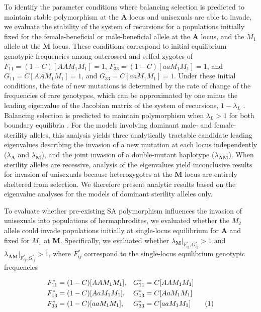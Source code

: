 \documentclass[9pt,twocolumn,twoside,lineno]{gsajnl}
\newcommand\numberthis{\addtocounter{equation}{1}\tag{\theequation}}
\begin{document}
To identify the parameter conditions where balancing selection is predicted to maintain stable polymorphism at the $\mathbf{A}$ locus and unisexuals are able to invade, we evaluate the stability of the system of recursions for a populations initially fixed for the female-beneficial or male-beneficial allele at the $\mathbf{A}$ locus, and the $M_1$ allele at the $\mathbf{M}$ locus. These conditions correspond to initial equilibrium genotypic frequencies among outcrossed and selfed zygotes of $F_{11} = (1 - C) [AAM_1M_1] = 1$, $F_{33} = (1 - C) [aaM_1M_1] = 1$, and $G_{11} = C [AAM_1M_1] = 1$, and $G_{33} = C [aaM_1M_1] = 1$. Under these initial conditions, the fate of new mutations is determined by the rate of change of the frequencies of rare genotypes, which can be approximated by one minus the leading eigenvalue of the Jacobian matrix of the system of recursions, $1 - \lambda_L$ \citep{OttoDay2007}. Balancing selection is predicted to maintain polymorphism when $\lambda_L > 1$ for both boundary equilibria \citep{Prout1968,OttoDay2007}. For the models involving dominant male- and female-sterility alleles, this analysis yields three analytically tractable candidate leading eigenvalues describing the invasion of a new mutation at each locus independently ($\lambda_\mathbf{A}$ and $\lambda_\mathbf{M}$), and the joint invasion of a double-mutant haplotype ($\lambda_\mathbf{AM}$). When sterility alleles are recessive, analysis of the eigenvalues yield inconclusive results for invasion of unisexuals because heterozygotes at the $\mathbf{M}$ locus are entirely sheltered from selection. We therefore present analytic results based on the eigenvalue analyses for the models of dominant sterility alleles only.

To evaluate whether pre-existing SA polymorphism influences the invasion of unisexuals into populations of hermaphrodites, we evaluated whether the $M_2$ allele could invade populations initially at single-locus equilibrium for $\mathbf{A}$ and fixed for $M_1$ at $\mathbf{M}$. Specifically, we evaluated whether $\lambda_\mathbf{M} \rvert_{F^{\ast}_{ij},G^{\ast}_{ij}} > 1$ and $\lambda_\mathbf{AM} \rvert_{F^{\ast}_{ij},G^{\ast}_{ij}} > 1$, where $F^{\ast}_{ij}$ correspond to the single-locus equilibrium genotypic frequencies
\begin{linenomath}\begin{align*} \label{eq:SA1locEQ}
	F^{\ast}_{11} &= (1 - C)[AAM_1M_1],& G^{\ast}_{11} &= C[AAM_1M_1]  \\
	F^{\ast}_{13} &= (1 - C)[AaM_1M_1],& G^{\ast}_{13} &= C[AaM_1M_1] \\
	F^{\ast}_{33} &= (1 - C)[aaM_1M_1],& G^{\ast}_{33} &= C[aaM_1M_1] \numberthis \\
\end{align*}\end{linenomath}
\end{document}
